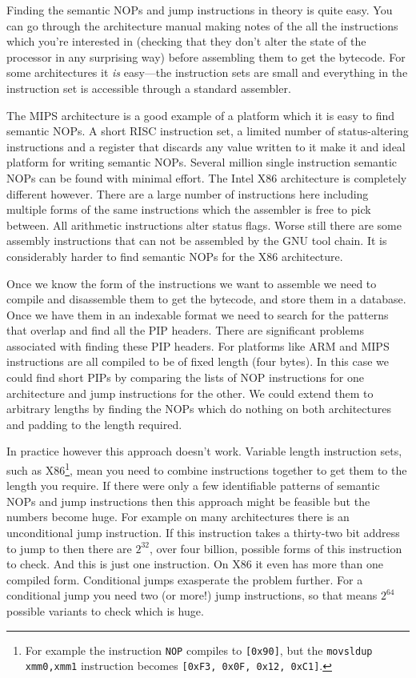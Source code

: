 \documentclass[10pt,]{book}
\begin{document}
Finding the semantic NOPs and jump instructions in theory is quite easy.
You can go through the architecture manual making notes of the all the
instructions which you're interested in (checking that they don't alter
the state of the processor in any surprising way) before assembling them
to get the bytecode. For some architectures it \emph{is} easy---the
instruction sets are small and everything in the instruction set is
accessible through a standard assembler.

The MIPS architecture\autocite{MIPSTechnologiesInc:2011ta} is a good
example of a platform which it is easy to find semantic NOPs. A short
RISC instruction set, a limited number of status-altering instructions
and a register that discards any value written to it make it and ideal
platform for writing semantic NOPs. Several million single instruction
semantic NOPs can be found with minimal effort. The Intel X86
architecture\autocite{IntelCorporation:1997ta} is completely different
however. There are a large number of instructions here including
multiple forms of the same instructions which the assembler is free to
pick between. All arithmetic instructions alter status flags. Worse
still there are some assembly instructions that can not be assembled by
the GNU tool chain\autocite{Anonymous:td}. It is considerably harder to
find semantic NOPs for the X86 architecture.

Once we know the form of the instructions we want to assemble we need to
compile and disassemble them to get the bytecode, and store them in a
database. Once we have them in an indexable format we need to search for
the patterns that overlap and find all the PIP headers. There are
significant problems associated with finding these PIP headers. For
platforms like ARM\autocite{Seal:2000vd} and
MIPS\autocite{MIPSTechnologiesInc:2011ta} instructions are all compiled
to be of fixed length (four bytes). In this case we could find short
PIPs by comparing the lists of NOP instructions for one architecture and
jump instructions for the other. We could extend them to arbitrary
lengths by finding the NOPs which do nothing on both architectures and
padding to the length required.

In practice however this approach doesn't work. Variable length
instruction sets, such as X86\footnote{For example the instruction
  \lstinline!NOP! compiles to \lstinline![0x90]!, but the
  \lstinline!movsldup xmm0,xmm1! instruction becomes
  \lstinline![0xF3, 0x0F, 0x12, 0xC1]!.}, mean you need to combine
instructions together to get them to the length you require. If there
were only a few identifiable patterns of semantic NOPs and jump
instructions then this approach might be feasible but the numbers become
huge. For example on many architectures there is an unconditional jump
instruction. If this instruction takes a thirty-two bit address to jump
to then there are $2^{32}$, over four billion, possible forms of this
instruction to check. And this is just one instruction. On X86 it even
has more than one compiled form. Conditional jumps exasperate the
problem further. For a conditional jump you need two (or more!) jump
instructions, so that means $2^{64}$ possible variants to check which is
huge.
\end{document}
